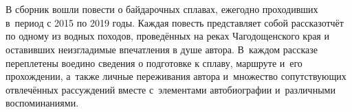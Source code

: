 \chapter*{}

В сборник вошли повести о байдарочных сплавах, ежегодно проходивших в~период с 2015 по 2019 годы. Каждая повесть представляет собой рассказ\sdash отчёт по одному из водных походов, проведённых на реках Чагодощенского края и оставивших неизгладимые впечатления в душе автора. В~каждом рассказе переплетены воедино сведения о подготовке к сплаву, маршруте и~его прохождении, а~также личные переживания автора и~множество сопутствующих отвлечённых рассуждений вместе с~элементами автобиографии и~различными воспоминаниями.

